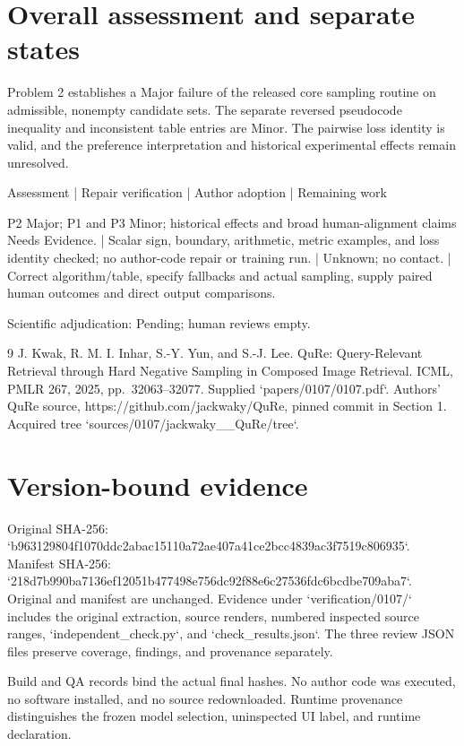 \documentclass[10pt]{article}
\begin{document}
\section*{Overall assessment and separate states}
Problem 2 establishes a Major failure of the released core sampling routine on admissible, nonempty candidate sets. The separate reversed pseudocode inequality and inconsistent table entries are Minor. The pairwise loss identity is valid, and the preference interpretation and historical experimental effects remain unresolved.\par
Assessment | Repair verification | Author adoption | Remaining work\par
P2 Major; P1 and P3 Minor; historical effects and broad human-alignment claims Needs Evidence. | Scalar sign, boundary, arithmetic, metric examples, and loss identity checked; no author-code repair or training run. | Unknown; no contact. | Correct algorithm/table, specify fallbacks and actual sampling, supply paired human outcomes and direct output comparisons.\par
Scientific adjudication: Pending; human reviews empty.\par
9 J. Kwak, R. M. I. Inhar, S.-Y. Yun, and S.-J. Lee. QuRe: Query-Relevant Retrieval through Hard Negative Sampling in Composed Image Retrieval. ICML, PMLR 267, 2025, pp. 32063–32077. Supplied `papers/0107/0107.pdf`. Authors’ QuRe source, https://github.com/jackwaky/QuRe, pinned commit in Section 1. Acquired tree `sources/0107/jackwaky\_\_QuRe/tree`.\par
\section*{Version-bound evidence}
Original SHA-256: `b963129804f1070ddc2abac15110a72ae407a41ce2bcc4839ac3f7519c806935`. Manifest SHA-256: `218d7b990ba7136ef12051b477498e756dc92f88e6c27536fdc6bcdbe709aba7`. Original and manifest are unchanged. Evidence under `verification/0107/` includes the original extraction, source renders, numbered inspected source ranges, `independent\_check.py`, and `check\_results.json`. The three review JSON files preserve coverage, findings, and provenance separately.\par
Build and QA records bind the actual final hashes. No author code was executed, no software installed, and no source redownloaded. Runtime provenance distinguishes the frozen model selection, uninspected UI label, and runtime declaration.\par
\end{document}
